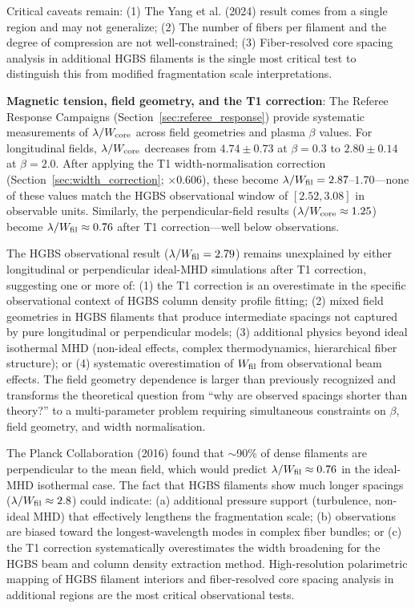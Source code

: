 \documentclass[twoside,twocolumn]{mnras}
\begin{document}
Critical caveats remain: (1) The Yang et al. (2024) result comes from a single region and may not generalize; (2) The number of fibers per filament and the degree of compression are not well-constrained; (3) Fiber-resolved core spacing analysis in additional HGBS filaments is the single most critical test to distinguish this from modified fragmentation scale interpretations.

\textbf{Magnetic tension, field geometry, and the T1 correction}: The Referee Response Campaigns (Section~\ref{sec:referee_response}) provide systematic measurements of $\lambda/W_{\rm core}$ across field geometries and plasma $\beta$ values. For longitudinal fields, $\lambda/W_{\rm core}$ decreases from $4.74 \pm 0.73$ at $\beta = 0.3$ to $2.80 \pm 0.14$ at $\beta = 2.0$. After applying the T1 width-normalisation correction (Section~\ref{sec:width_correction}; $\times 0.606$), these become $\lambda/W_{\rm fil} = 2.87$--$1.70$---none of these values match the HGBS observational window of $[2.52, 3.08]$ in observable units. Similarly, the perpendicular-field results ($\lambda/W_{\rm core} \approx 1.25$) become $\lambda/W_{\rm fil} \approx 0.76$ after T1 correction---well below observations.

The HGBS observational result ($\lambda/W_{\rm fil} = 2.79$) remains unexplained by either longitudinal or perpendicular ideal-MHD simulations after T1 correction, suggesting one or more of: (1) the T1 correction is an overestimate in the specific observational context of HGBS column density profile fitting; (2) mixed field geometries in HGBS filaments that produce intermediate spacings not captured by pure longitudinal or perpendicular models; (3) additional physics beyond ideal isothermal MHD (non-ideal effects, complex thermodynamics, hierarchical fiber structure); or (4) systematic overestimation of $W_{\rm fil}$ from observational beam effects. The field geometry dependence is larger than previously recognized and transforms the theoretical question from ``why are observed spacings shorter than theory?'' to a multi-parameter problem requiring simultaneous constraints on $\beta$, field geometry, and width normalisation.

The Planck Collaboration (2016) found that $\sim$90\% of dense filaments are perpendicular to the mean field, which would predict $\lambda/W_{\rm fil} \approx 0.76$ in the ideal-MHD isothermal case. The fact that HGBS filaments show much longer spacings ($\lambda/W_{\rm fil} \approx 2.8$) could indicate: (a) additional pressure support (turbulence, non-ideal MHD) that effectively lengthens the fragmentation scale; (b) observations are biased toward the longest-wavelength modes in complex fiber bundles; or (c) the T1 correction systematically overestimates the width broadening for the HGBS beam and column density extraction method. High-resolution polarimetric mapping of HGBS filament interiors and fiber-resolved core spacing analysis in additional regions are the most critical observational tests.
\end{document}
